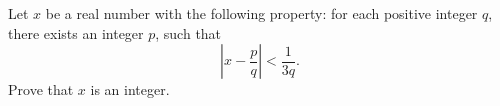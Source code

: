 \documentclass[varwidth]{standalone}
\begin{document}
    Let $x$ be a real number with the following property: for each positive integer $q$, there exists an integer $p$, such that
    \[
        \left| x - \frac{p}{q} \right| < \frac{1}{3q}.
    \]
    Prove that $x$ is an integer.
\end{document}
